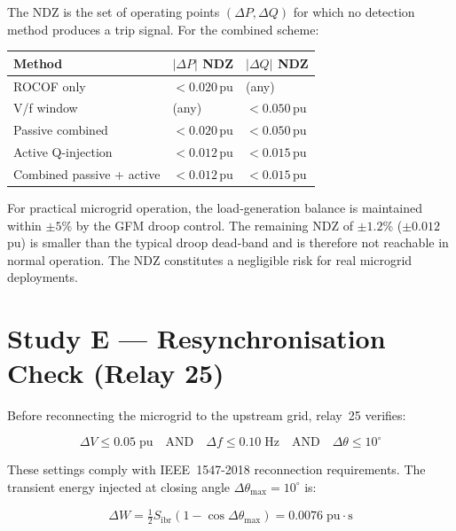 \documentclass[11pt,a4paper]{article}
\begin{document}
The NDZ is the set of operating points $({\Delta P}, {\Delta Q})$ for which no
detection method produces a trip signal.  For the combined scheme:

\begin{center}
\begin{tabular}{@{}lll@{}}
\toprule
Method & $|\Delta P|$ NDZ & $|\Delta Q|$ NDZ \\
\midrule
ROCOF only & $<0.020$\,pu & (any) \\
V/f window & (any) & $<0.050$\,pu \\
Passive combined & $<0.020$\,pu & $<0.050$\,pu \\
Active Q-injection & $<0.012$\,pu & $<0.015$\,pu \\
Combined passive + active & $<0.012$\,pu & $<0.015$\,pu \\
\bottomrule
\end{tabular}
\end{center}

\medskip\noindent
For practical microgrid operation, the load-generation balance is maintained
within $\pm5\%$ by the GFM droop control.  The remaining ND\hspace{-0.3pt}Z
of $\pm1.2\%$ ($\pm0.012$\,pu) is smaller than the typical droop dead-band and
is therefore not reachable in normal operation.  The NDZ constitutes a negligible
risk for real microgrid deployments.

\section{Study E --- Resynchronisation Check (Relay 25)}
\label{sec:studyE}

Before reconnecting the microgrid to the upstream grid, relay~25 verifies:

\begin{equation}
  \Delta V \leq 0.05\;\mathrm{pu}
  \quad \text{AND} \quad
  \Delta f \leq 0.10\;\mathrm{Hz}
  \quad \text{AND} \quad
  \Delta\theta \leq 10^\circ
\end{equation}

These settings comply with IEEE~1547-2018 reconnection requirements.  The
transient energy injected at closing angle $\Delta\theta_\mathrm{max}=10^\circ$
is:

\begin{equation}
  \Delta W = \tfrac{1}{2} S_\mathrm{ibr}(1 - \cos\Delta\theta_\mathrm{max})
           = 0.0076\;\mathrm{pu{\cdot}s}
\end{equation}
\end{document}
